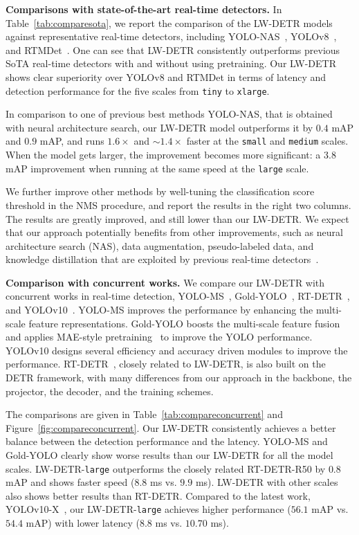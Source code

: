 \documentclass[runningheads]{llncs}
\begin{document}
\vspace{1mm}
\noindent\textbf{Comparisons with state-of-the-art real-time detectors.} 
In Table~\ref{tab:comparesota}, 
we report the comparison of the LW-DETR models against representative real-time detectors, including YOLO-NAS~\cite{supergradients}, YOLOv8~\cite{yolov8_ultralytics}, and RTMDet~\cite{lyu2022rtmdet}. 
One can see that LW-DETR consistently outperforms previous SoTA real-time detectors
with and without using pretraining. 
Our LW-DETR shows clear superiority over YOLOv8 and RTMDet
in terms of latency and detection performance for the five scales from \texttt{tiny} to \texttt{xlarge}. 

In comparison to one of previous best methods YOLO-NAS,
that is obtained with neural architecture search,
our LW-DETR model outperforms it by $0.4$ mAP and $0.9$ mAP, and runs $1.6\times$ and $\sim$$1.4\times$ faster at the \texttt{small} and \texttt{medium} scales. When the model gets larger, the improvement becomes more significant: a $3.8$ mAP improvement when running at the same speed 
at the \texttt{large} scale. 

We further improve other methods
by well-tuning the classification score threshold in the NMS procedure,
and report the results 
in the right two columns.
The results are greatly improved,
and still lower than our LW-DETR.
We expect that our approach potentially
benefits
from other improvements, such as 
neural architecture search (NAS), 
data augmentation, pseudo-labeled data, and knowledge distillation that are exploited
by previous real-time  detectors~\cite{lyu2022rtmdet,yolov8_ultralytics,supergradients}.

\vspace{1mm}
\noindent\textbf{Comparison with concurrent works.} We compare our LW-DETR with concurrent works in real-time detection, YOLO-MS~\cite{chen2023yolo}, Gold-YOLO~\cite{wang2023gold}, RT-DETR~\cite{lv2023detrs}, and YOLOv10~\cite{wang2024yolov10}. 
YOLO-MS improves the performance by enhancing the multi-scale feature representations. 
Gold-YOLO boosts the multi-scale feature fusion and applies MAE-style pretraining~\cite{he2022masked} to improve the YOLO performance. 
YOLOv10 designs several efficiency and accuracy driven modules to improve the performance.
RT-DETR~\cite{lv2023detrs}, closely related to LW-DETR, is also built on the DETR framework, with many differences from our approach in the backbone, the projector, the decoder, and the training schemes. 

The comparisons are given in Table~\ref{tab:compareconcurrent} and Figure~\ref{fig:compareconcurrent}. 
Our LW-DETR consistently achieves a better balance between the detection performance and the latency. 
YOLO-MS and Gold-YOLO clearly show worse results than our LW-DETR
for all the model scales.
LW-DETR-\texttt{large} outperforms the closely related RT-DETR-R50 by $0.8$ mAP and shows faster speed ($8.8$ ms {vs.} $9.9$ ms). 
LW-DETR with other scales also shows
better results than RT-DETR.
Compared to the latest work, YOLOv10-X~\cite{wang2024yolov10}, our LW-DETR-\texttt{large} achieves higher performance ($56.1$ mAP {vs.} $54.4$ mAP) with lower latency ($8.8$ ms {vs.} $10.70$ ms).
\end{document}
